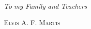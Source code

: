 
\begin{center}
    \thispagestyle{empty}
    
    \vspace*{\fill}
    
    \textit{To my Family and Teachers}
    
    \begin{flushright}
        {\sffamily\scshape Elvis A. F. Martis}
    \end{flushright}
    
    \vspace*{\fill}
\end{center}
